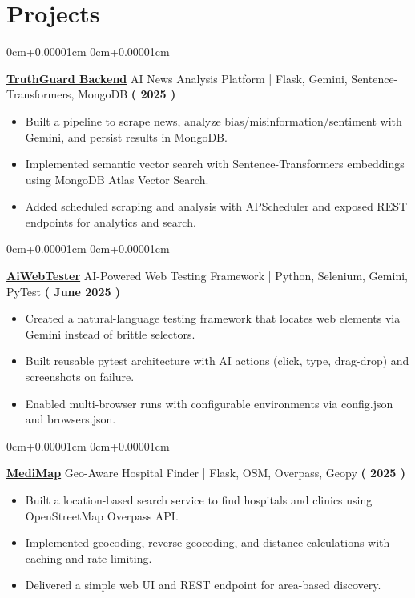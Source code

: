 \documentclass[10pt,a4paper]{article}
\newenvironment{highlights}{
    \begin{itemize}[
        topsep=0.10cm,
        parsep=0.10cm,
        partopsep=0pt,
        itemsep=0pt,
        leftmargin=10pt,
    ]
    }{
    \end{itemize}
}
\newenvironment{onecolentry}{
    \begin{adjustwidth}{
        0cm+0.00001cm
    }{
        0cm+0.00001cm
    }
    }{
    \end{adjustwidth}
}
\begin{document}
    \section{Projects}\label{sec:projects}
    \begin{onecolentry}
        \textbf{\href{https://github.com/Jefino9488/TruthGuard-Backend}{TruthGuard Backend}} AI News Analysis Platform | Flask, Gemini, Sentence-Transformers, MongoDB \hfill \textbf{( 2025 )} \\
        \begin{highlights}
            \item Built a pipeline to scrape news, analyze bias/misinformation/sentiment with Gemini, and persist results in MongoDB.
            \item Implemented semantic vector search with Sentence-Transformers embeddings using MongoDB Atlas Vector Search.
            \item Added scheduled scraping and analysis with APScheduler and exposed REST endpoints for analytics and search.
        \end{highlights}
    \end{onecolentry}
    \vspace{0.1cm}
    \begin{onecolentry}
        \textbf{\href{https://github.com/Jefino9488/AiWebTester}{AiWebTester}} AI-Powered Web Testing Framework | Python, Selenium, Gemini, PyTest \hfill \textbf{( June 2025 )} \\
        \begin{highlights}
            \item Created a natural-language testing framework that locates web elements via Gemini instead of brittle selectors.
            \item Built reusable pytest architecture with AI actions (click, type, drag-drop) and screenshots on failure.
            \item Enabled multi-browser runs with configurable environments via config.json and browsers.json.
        \end{highlights}
    \end{onecolentry}
    \vspace{0.1cm}
    \begin{onecolentry}
        \textbf{\href{https://github.com/Jefino9488/MediMap}{MediMap}} Geo-Aware Hospital Finder | Flask, OSM, Overpass, Geopy \hfill \textbf{( 2025 )} \\
        \begin{highlights}
            \item Built a location-based search service to find hospitals and clinics using OpenStreetMap Overpass API.
            \item Implemented geocoding, reverse geocoding, and distance calculations with caching and rate limiting.
            \item Delivered a simple web UI and REST endpoint for area-based discovery.
        \end{highlights}
    \end{onecolentry}
\end{document}
